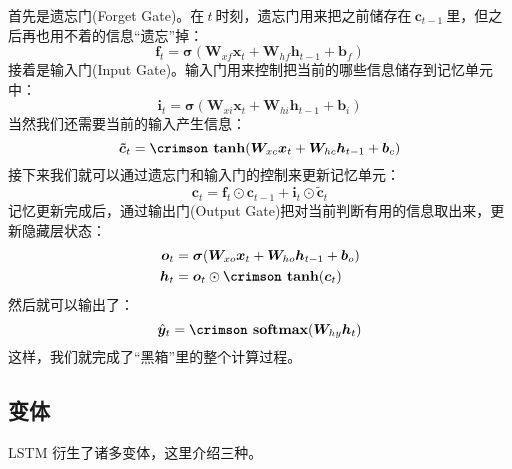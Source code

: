 \documentclass[12pt,a4paper]{article}
\begin{document}
首先是{\hei 遗忘门}({\crimson Forget Gate})。在$\:t\:$时刻，遗忘门用来把之前储存在$\:\bm{c}_{t-1}\:$里，但之后再也用不着的信息“遗忘”掉：
\begin{equation}
\bm{f}_t = \bm{\sigma}(\bm{W}_{xf}\bm{x}_t + \bm{W}_{hf}\bm{h}_{t-1} + \bm{b}_f)
\end{equation}
接着是{\hei 输入门}({\crimson Input Gate})。输入门用来控制把当前的哪些信息储存到记忆单元中：
\begin{equation}
\bm{i}_t = \bm{\sigma}(\bm{W}_{xi}\bm{x}_t + \bm{W}_{hi}\bm{h}_{t-1} + \bm{b}_i)
\end{equation}
当然我们还需要当前的输入产生信息：
\begin{equation}
\bm{\tilde{c}}_t = \textbf{\crimson tanh}(\bm{W}_{xc}\bm{x}_t + \bm{W}_{hc}\bm{h}_{t-1} + \bm{b}_c)
\end{equation}
接下来我们就可以通过遗忘门和输入门的控制来更新记忆单元：
\begin{equation}
\bm{c}_t = \bm{f}_t \odot \bm{c}_{t - 1} + \bm{i}_t \odot \bm{\tilde{c}}_t
\end{equation}
记忆更新完成后，通过{\hei 输出门}({\crimson Output Gate})把对当前判断有用的信息取出来，更新隐藏层状态：
\begin{align}
\bm{o}_t &= \bm{\sigma}(\bm{W}_{xo}\bm{x}_t + \bm{W}_{ho}\bm{h}_{t-1} + \bm{b}_o) \\
\bm{h}_t &= \bm{o}_t \odot \textbf{\crimson tanh}(\bm{c}_{t})
\end{align}
然后就可以输出了：
\begin{equation}
\hat{\bm{y}}_t = \textbf{\crimson softmax}(\bm{W}_{hy}\bm{h}_t)
\end{equation}
这样，我们就完成了“黑箱”里的整个计算过程。

\subsection{变体}

{\crimson LSTM} 衍生了诸多变体，这里介绍三种。
\end{document}
